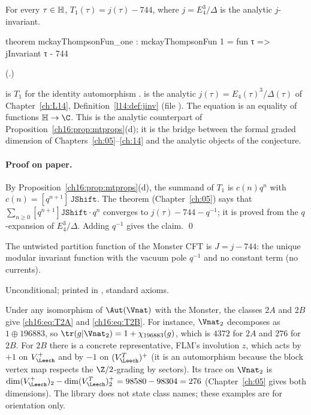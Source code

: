 \begin{theorem}[$T_1=J$]\label{ch16:thm:T1}
For every $\tau\in\mathbb{H}$, $T_1(\tau)=j(\tau)-744$, where $j=E_4^3/\Delta$ is the analytic $j$-invariant.
\end{theorem}
\begin{leancode}
theorem mckayThompsonFun_one :
    mckayThompsonFun 1 = fun τ => jInvariant τ - 744
\end{leancode}
(.)
\begin{dictionary}
 is $T_1$ for the identity automorphism .   is the
analytic $j(\tau)=E_4(\tau)^3/\Delta(\tau)$ of Chapter~\ref{ch:L14}, Definition~\ref{l14:def:jinv} (file
).  The equation is an equality of functions $\chsixteenH\to\C$.
This is the analytic counterpart of Proposition~\ref{ch16:prop:mtprops}(d); it is the bridge between the formal
graded dimension of Chapters~\ref{ch:05}--\ref{ch:14} and the analytic objects of the conjecture.
\end{dictionary}
\paragraph{Proof on paper.}  By Proposition~\ref{ch16:prop:mtprops}(d), the summand of $T_1$ is $c(n)q^n$ with
$c(n)=[q^{n+1}]\,\mathtt{JShift}$.  The theorem  (Chapter~\ref{ch:05}) says that
$\sum_{n\ge0}[q^{n+1}]\mathtt{JShift}\cdot q^n$ converges to $j(\tau)-744-q^{-1}$; it is proved from the
$q$-expansion of $E_4^3/\Delta$.  Adding $q^{-1}$ gives the claim. \qed
\begin{physics}
The untwisted partition function of the Monster CFT is $J=j-744$: the unique modular invariant function with the
vacuum pole $q^{-1}$ and no constant term (no currents).
\end{physics}
\begin{status}
Unconditional; printed in , standard axioms.
\end{status}

\begin{example}\label{ch16:ex:T2}
Under any isomorphism of $\Aut(\Vnat)$ with the Monster, the classes $2A$ and $2B$ give \eqref{ch16:eq:T2A} and
\eqref{ch16:eq:T2B}.  For instance, $\Vnat_2$ decomposes as $1\oplus196883$, so $\tr(g|\Vnat_2)=1+\chi_{196883}(g)$,
which is $4372$ for $2A$ and $276$ for $2B$.  For $2B$ there is a concrete representative, FLM's involution $z$,
which acts by $+1$ on $V_\Leech^+$ and by $-1$ on $(V_\Leech^T)^+$ (it is an automorphism because the block vertex
map respects the $\Z/2$-grading by sectors).  Its trace on $\Vnat_2$ is
$\dim(V_\Leech^+)_2-\dim(V_\Leech^T)^+_2=98580-98304=276$ (Chapter~\ref{ch:05} gives both dimensions).  The library
does not state class names; these examples are for orientation only.
\end{example}


